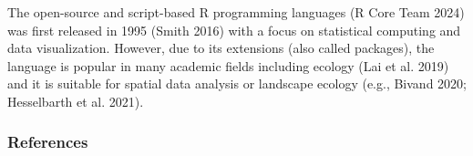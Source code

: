\documentclass[
  10pt,
  a4paperpaper,
]{article}
\begin{document}
The open-source and script-based R programming languages (R Core Team
2024) was first released in 1995 (Smith 2016) with a focus on
statistical computing and data visualization. However, due to its
extensions (also called packages), the language is popular in many
academic fields including ecology (Lai et al. 2019) and it is suitable
for spatial data analysis or landscape ecology (e.g., Bivand 2020;
Hesselbarth et al. 2021).

\newpage{}

\subsubsection*{References}\label{references}

\begingroup
\raggedright
\end{document}
